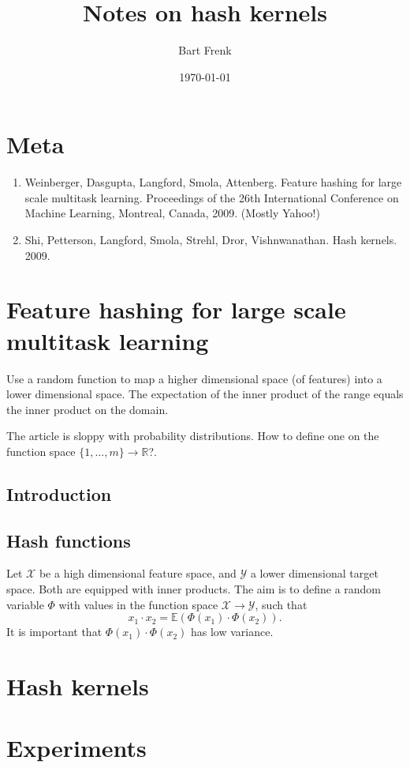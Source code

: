 \documentclass[11pt]{article}
\author{Bart Frenk}
\date{\today}
\title{Notes on hash kernels}
\begin{document}
\maketitle

\section{Meta}
\label{sec-1}


\begin{enumerate}
\item Weinberger, Dasgupta, Langford, Smola, Attenberg. Feature hashing for large
scale multitask learning. Proceedings of the 26th International Conference on
Machine Learning, Montreal, Canada, 2009. (Mostly Yahoo!)
\item Shi, Petterson, Langford, Smola, Strehl, Dror, Vishnwanathan. Hash
kernels. 2009.
\end{enumerate}

\section{Feature hashing for large scale multitask learning}
\label{sec-2}

Use a random function to map a higher dimensional space (of features) into a
lower dimensional space. The expectation of the inner product of the range
equals the inner product on the domain.

The article is sloppy with probability distributions. How to define one on the
function space $\{1, \ldots, m\} \rightarrow \mathbb{R}$?.

\subsection{Introduction}
\label{sec-2-1}
\subsection{Hash functions}
\label{sec-2-2}

Let $\mathcal{X}$ be a high dimensional feature space, and $\mathcal{Y}$ a lower
dimensional target space. Both are equipped with inner products. The aim is to
define a random variable $\Phi$ with values in the function space $\mathcal{X}
\rightarrow \mathcal{Y}$, such that
\[
x_1 \cdot x_2 = \mathbb{E}(\Phi(x_1) \cdot \Phi(x_2)).
\]
It is important that $\Phi(x_1) \cdot \Phi(x_2)$ has low variance.




\section{Hash kernels}
\label{sec-3}

\section{Experiments}
\label{sec-4}
\end{document}
